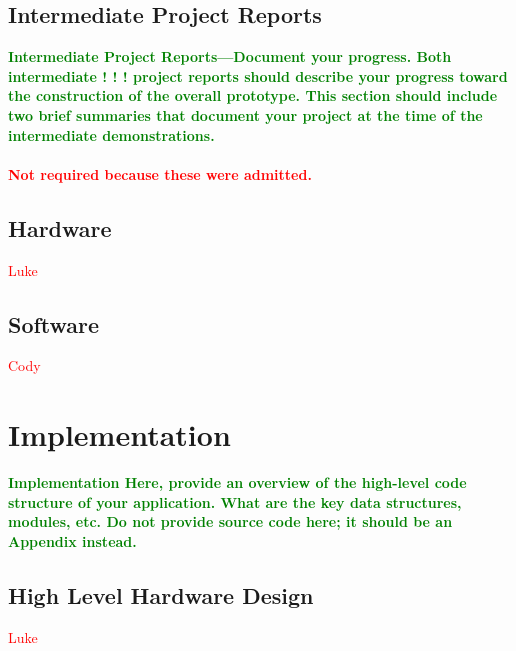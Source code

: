 \documentclass{article}
\numberwithin{equation}{section} %
\begin{document}
\subsection{Intermediate Project Reports}
\textcolor{green}{\bf Intermediate Project Reports—Document your progress. Both intermediate ! ! ! project reports should describe your progress toward the construction of the overall prototype. This section should include two brief summaries that document your project at the time of the intermediate demonstrations.} \\ \\
\textcolor{red}{\bf Not required because these were admitted.}

\subsection{Hardware}
\textcolor{red}{Luke}

\subsection{Software}
\textcolor{red}{Cody}

\section{Implementation}
\textcolor{green}{\bf Implementation Here, provide an overview of the high-level code structure of your application. What are the key data structures, modules, etc. Do not provide source code here; it should be an Appendix instead.}

\subsection{High Level Hardware Design}
\textcolor{red}{Luke}

\end{document}
